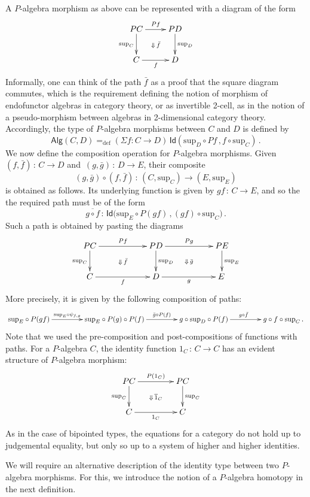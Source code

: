 \documentclass[10pt,a4paper,oneside,reqno]{amsart}
\numberwithin{equation}{section}
\theoremstyle{mythm}
\theoremstyle{mydef}
\theoremstyle{myrmk}
\newcommand{\defeq}{=_{\mathrm{def}}}
\newcommand{\co}{\,{:}\,}
\newcommand{\Id}{\mathsf{Id}}
\newcommand{\Palg}{\mathsf{Alg}}
\renewcommand{\sup}{\mathrm{sup}}
\begin{document}
A $P$-algebra morphism as above can be represented with a diagram of the form
\[
\xymatrix{
 PC \ar[d]_{\sup_C} \ar[r]^{Pf}  \ar@{}[dr]|{\Downarrow \, \bar{f}} &  PD \ar[d]^{\sup_D}\\
C \ar[r]_{f}   & D}
\] 
Informally, one can think of the path $\bar{f}$ as a proof that the square diagram commutes, which is the 
requirement defining the notion of morphism of endofunctor algebras in category theory, or as invertible
2-cell, as in the notion of a pseudo-morphism between algebras in 2-dimensional category theory.  
Accordingly, the type of $P$-algebra 
morphisms between $C$ and $D$ is defined by
\[
\Palg(C,D)
 \defeq  
(\Sigma f:  C \rightarrow D) \, \Id(\sup_D \circ P f  \, , f\circ \sup_C  )  \, .
\]
We now define the composition operation for $P$-algebra morphisms. Given $(f, \bar{f}) \co C \to D$ and~$(g, \bar{g}) \co D \to E$,
their composite 
\[
(g, \bar{g}) \circ (f, \bar{f}) \co (C, \sup_C) \to (E, \sup_E)
\] 
is obtained as follows. Its underlying function is given by $gf\co C \to E$, and so the 
the required path must be of the form
\[
 \overline{ g \circ f} \co \Id\big(  \sup_E \circ P(gf) \, ,  (gf) \circ \sup_C \big)\, .
\]
Such a path is obtained by pasting the diagrams 
\[
\xymatrix@C=2cm{
 PC \ar[d]_{\sup_C} \ar[r]^{Pf}  \ar@{}[dr]|{\Downarrow \, \bar{f}} &  
 PD \ar[d]^{\sup_D}  \ar[r]^{Pg}  \ar@{}[dr]|{\Downarrow \, \bar{g}} &  PE \ar[d]^{\sup_E} \\
C \ar[r]_{f}   & D \ar[r]_{g}   & E \,  }
\]
More precisely, it is given by the following composition of paths:
\[
\xymatrix@C=1.5cm{
\sup_E \circ P (gf) \ar[r]^-{\sup_E \circ \psi_{f,g}} &
 \sup_E \circ P(g) \circ P(f) \ar[r]^-{\bar{g} \circ P(f)} & 
 g \circ \sup_D \circ P(f) \ar[r]^{g \circ \bar{f}} & 
g \circ f \circ \sup_C\, .}
\]
Note that we used the pre-composition and post-compositions of functions with paths. 
For a $P$-algebra $C$,  the identity function $1_C \co C \to C$ has an evident structure of $P$-algebra morphism:
\begin{equation}
\label{equ:palgid}
\xymatrix@C=1.5cm{
PC \ar[r]^{P(1_C)}  \ar[d]_{\sup_C} \ar@{}[dr]|{\Downarrow \, \overline{1}_C} & PC \ar[d]^{\sup_C} \\
C \ar[r]_{1_C} & C}
\end{equation}
As in the case of bipointed types, the equations for a category do not hold up to judgemental equality, but only so up to a system of higher and higher identities. 

\medskip

We will require an alternative description of the identity type between two $P$-algebra morphisms. For this, we introduce 
the notion of a $P$-algebra homotopy in the next definition.
\end{document}
